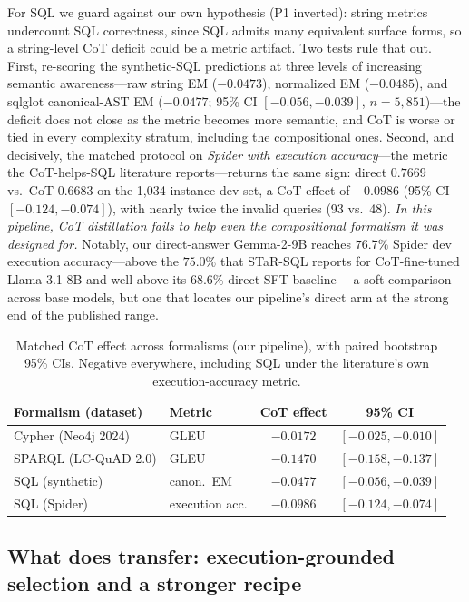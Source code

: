 \documentclass[11pt]{article}
\begin{document}
For SQL we guard against our own hypothesis (P1 inverted): string metrics undercount SQL
correctness, since SQL admits many equivalent surface forms, so a string-level CoT deficit could be
a metric artifact. Two tests rule that out. First, re-scoring the synthetic-SQL predictions at three
levels of increasing semantic awareness---raw string EM ($-0.0473$), normalized EM ($-0.0485$), and
sqlglot canonical-AST EM ($-0.0477$; 95\% CI $[-0.056, -0.039]$, $n{=}5{,}851$)---the deficit does
not close as the metric becomes more semantic, and CoT is worse or tied in every complexity stratum,
including the compositional ones. Second, and decisively, the matched protocol on \emph{Spider with
execution accuracy}---the metric the CoT-helps-SQL literature reports---returns the same sign:
direct $0.7669$ vs.\ CoT $0.6683$ on the 1{,}034-instance dev set, a CoT effect of $-0.0986$
(95\% CI $[-0.124, -0.074]$), with nearly twice the invalid queries (93 vs.\ 48). \emph{In this
pipeline, CoT distillation fails to help even the compositional formalism it was designed for.}
Notably, our direct-answer Gemma-2-9B reaches $76.7\%$ Spider dev execution accuracy---above the
$75.0\%$ that STaR-SQL reports for CoT-fine-tuned Llama-3.1-8B and well above its $68.6\%$
direct-SFT baseline \citep{he2025starsql}---a soft comparison across base models, but one that
locates our pipeline's direct arm at the strong end of the published range.

\begin{table}[t]\centering
\caption{Matched CoT effect across formalisms (our pipeline), with paired bootstrap 95\% CIs.
Negative everywhere, including SQL under the literature's own execution-accuracy metric.}
\label{tab:crossform}
\begin{tabular}{llcc}
\toprule
Formalism (dataset) & Metric & CoT effect & 95\% CI \\
\midrule
Cypher (Neo4j 2024) & GLEU & $-0.0172$ & $[-0.025, -0.010]$ \\
SPARQL (LC-QuAD 2.0) & GLEU & $-0.1470$ & $[-0.158, -0.137]$ \\
SQL (synthetic) & canon.\ EM & $-0.0477$ & $[-0.056, -0.039]$ \\
SQL (Spider) & execution acc. & $-0.0986$ & $[-0.124, -0.074]$ \\
\bottomrule
\end{tabular}
\end{table}

\subsection{What does transfer: execution-grounded selection and a stronger recipe}
\label{sec:positive}
\end{document}
